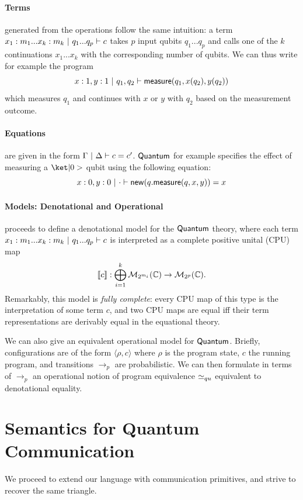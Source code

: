 \documentclass[sigplan, nonacm]{acmart}
\begin{document}
\paragraph{Terms} generated from the operations follow the same intuition: a term $x_1: m_1...x_k: m_k \ | \ q_1...q_p \vdash c$ takes $p$ input qubits $q_1...q_p$ and calls one of the $k$ continuations $x_1...x_k$ with the corresponding number of qubits. We can thus write for example the program 
  \[
  x: 1, y: 1 \ | \ q_1, q_2 \vdash \mathsf{measure}(q_1, x(q_2), y(q_2))
  \]
  which measures $q_1$ and continues with $x$ or $y$ with $q_2$ based on the measurement outcome. 
\paragraph{Equations} are given in the form $\Gamma \ | \ \Delta \vdash c=c'$. $\mathsf{Quantum}$ for example specifies the effect of measuring a $\ket|0>$ qubit using the following equation:
\[
x: 0, y: 0 \ | \ \cdot \vdash \mathsf{new}(q. \mathsf{measure}(q, x, y)) = x
\]

\paragraph{Models: Denotational and Operational} \cite{statonpopl15} proceeds to define a denotational model for the $\mathsf{Quantum}$ theory, where each term $x_1:m_1...x_k:m_k \ | \ q_1...q_p \vdash c$ is interpreted as a complete positive unital (CPU) map $$\llbracket c\rrbracket: \bigoplus_{i=1}^k\mathcal{M}_{2^{m_i}}(\mathbb{C}) \to \mathcal{M}_{2^p}(\mathbb{C}).$$ Remarkably, this model is \emph{fully complete}: every CPU map of this type is the interpretation of some term $c$, and two CPU maps are equal iff their term representations are derivably equal in the equational theory. 

We can also give an equivalent operational model for $\mathsf{Quantum}$. Briefly, configurations are of the form $\langle \rho, c \rangle$ where $\rho$ is the program state, $c$ the running program, and transitions $\to_p$ are probabilistic. We can then formulate in terms of $\to_p$ an operational notion of program equivalence $\simeq_{qu}$ equivalent to denotational equality. 

\section{Semantics for Quantum Communication}
We proceed to extend our language with communication primitives, and strive to recover the same triangle. 
\end{document}
